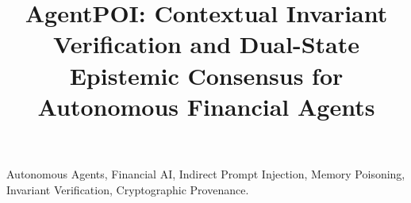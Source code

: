 \documentclass[conference]{IEEEtran}
\begin{document}
\title{AgentPOI: Contextual Invariant Verification and Dual-State Epistemic Consensus for Autonomous Financial Agents}

\author{
}

\maketitle



\begin{IEEEkeywords}
Autonomous Agents, Financial AI, Indirect Prompt Injection, Memory Poisoning, Invariant Verification, Cryptographic Provenance.
\end{IEEEkeywords}










\end{document}
